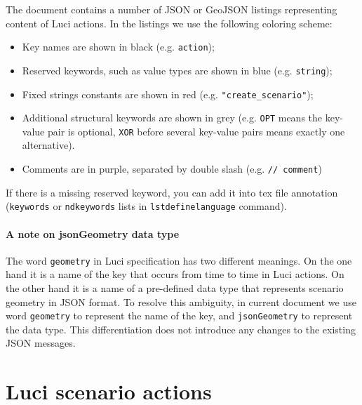 \documentclass[pdftex,11pt,a4paper]{article} %
\begin{document}
The document contains a number of JSON or GeoJSON listings representing content of \ac{Luci} actions.
In the listings we use the following coloring scheme:
%
\begin{itemize}
\item Key names are shown in black (e.g. \texttt{action});
\item Reserved keywords, such as value types are shown in blue (e.g. \texttt{\color{blue}string});
\item Fixed strings constants are shown in red (e.g. \texttt{\color{red}"create\_scenario"});
\item Additional structural keywords are shown in grey
(e.g. \texttt{\color{darkgray}OPT} means the key-value pair is optional, \texttt{\color{darkgray}XOR} before several key-value pairs means exactly one alternative).
\item Comments are in purple, separated by double slash (e.g. \texttt{\color{purple}// comment})
\end{itemize}
%
If there is a missing reserved keyword, you can add it into tex file annotation (\texttt{keywords} or \texttt{ndkeywords} lists in \texttt{lstdefinelanguage} command).

\paragraph{A note on jsonGeometry data type}
The word \texttt{geometry} in \ac{Luci} specification has two different meanings.
On the one hand it is a name of the key that occurs from time to time in \ac{Luci} actions.
On the other hand it is a name of a pre-defined data type that represents scenario geometry in JSON format.
To resolve this ambiguity, in current document we use word \texttt{geometry} to represent the name of the key, and \texttt{\color{blue}jsonGeometry} to represent the data type.
This differentiation does not introduce any changes to the existing JSON messages.

\section{\acs{Luci} scenario actions}
\label{sec:actions}

\end{document}
